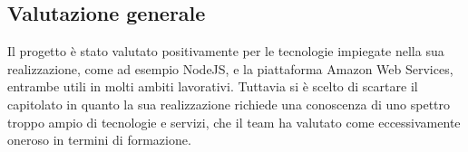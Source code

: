 \subsection{Valutazione generale}
Il progetto è stato valutato positivamente per le tecnologie impiegate nella sua realizzazione, come ad esempio NodeJS, e la piattaforma Amazon Web Services\glo, entrambe utili in molti ambiti lavorativi. 
Tuttavia si è scelto di scartare il capitolato in quanto la sua realizzazione richiede una conoscenza di uno spettro troppo ampio di tecnologie e servizi, che il team ha valutato come eccessivamente oneroso in termini di formazione. 
